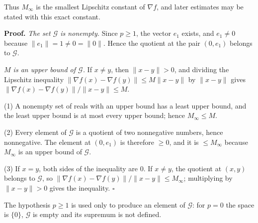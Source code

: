 \documentclass[11pt,a4paper]{report}
\begin{document}
Thus \(M_\infty\) is the smallest Lipschitz constant of \(\nabla f\), and later estimates may be stated with this exact constant.




\textbf{Proof.} \emph{The set \(\mathcal G\) is nonempty.} Since \(p\ge1\), the vector \(e_1\) exists, and \(e_1\ne0\) because \(\|e_1\|=1\ne0=\|0\|\). Hence the quotient at the pair \((0,e_1)\) belongs to \(\mathcal G\).




\emph{\(M\) is an upper bound of \(\mathcal G\).} If \(x\ne y\), then \(\|x-y\|>0\), and dividing the Lipschitz inequality \(\|\nabla f(x)-\nabla f(y)\|\le M\|x-y\|\) by \(\|x-y\|\) gives \(\|\nabla f(x)-\nabla f(y)\|/\|x-y\|\le M\).




(1) A nonempty set of reals with an upper bound has a least upper bound, and the least upper bound is at most every upper bound; hence \(M_\infty\le M\).




(2) Every element of \(\mathcal G\) is a quotient of two nonnegative numbers, hence nonnegative. The element at \((0,e_1)\) is therefore \(\ge0\), and it is \(\le M_\infty\) because \(M_\infty\) is an upper bound of \(\mathcal G\).




(3) If \(x=y\), both sides of the inequality are \(0\). If \(x\ne y\), the quotient at \((x,y)\) belongs to \(\mathcal G\), so \(\|\nabla f(x)-\nabla f(y)\|/\|x-y\|\le M_\infty\); multiplying by \(\|x-y\|>0\) gives the inequality. \(\square\)




The hypothesis \(p\ge1\) is used only to produce an element of \(\mathcal G\): for \(p=0\) the space is \(\{0\}\), \(\mathcal G\) is empty and its supremum is not defined.
\end{document}
